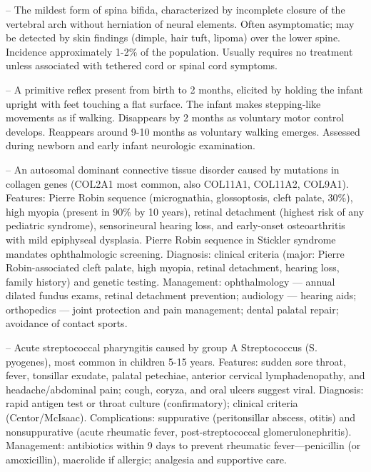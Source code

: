 -- The mildest form of spina bifida, characterized by incomplete closure of the vertebral arch without herniation of neural elements. Often asymptomatic; may be detected by skin findings (dimple, hair tuft, lipoma) over the lower spine. Incidence approximately 1-2\% of the population. Usually requires no treatment unless associated with tethered cord or spinal cord symptoms.

-- A primitive reflex present from birth to 2 months, elicited by holding the infant upright with feet touching a flat surface. The infant makes stepping-like movements as if walking. Disappears by 2 months as voluntary motor control develops. Reappears around 9-10 months as voluntary walking emerges. Assessed during newborn and early infant neurologic examination.

-- An autosomal dominant connective tissue disorder caused by mutations in collagen genes (COL2A1 most common, also COL11A1, COL11A2, COL9A1). Features: Pierre Robin sequence (micrognathia, glossoptosis, cleft palate, 30\%), high myopia (present in 90\% by 10 years), retinal detachment (highest risk of any pediatric syndrome), sensorineural hearing loss, and early-onset osteoarthritis with mild epiphyseal dysplasia. Pierre Robin sequence in Stickler syndrome mandates ophthalmologic screening. Diagnosis: clinical criteria (major: Pierre Robin-associated cleft palate, high myopia, retinal detachment, hearing loss, family history) and genetic testing. Management: ophthalmology — annual dilated fundus exams, retinal detachment prevention; audiology — hearing aids; orthopedics — joint protection and pain management; dental palatal repair; avoidance of contact sports.

-- Acute streptococcal pharyngitis caused by group A Streptococcus (S. pyogenes), most common in children 5-15 years. Features: sudden sore throat, fever, tonsillar exudate, palatal petechiae, anterior cervical lymphadenopathy, and headache/abdominal pain; cough, coryza, and oral ulcers suggest viral. Diagnosis: rapid antigen test or throat culture (confirmatory); clinical criteria (Centor/McIsaac). Complications: suppurative (peritonsillar abscess, otitis) and nonsuppurative (acute rheumatic fever, post-streptococcal glomerulonephritis). Management: antibiotics within 9 days to prevent rheumatic fever—penicillin (or amoxicillin), macrolide if allergic; analgesia and supportive care.

